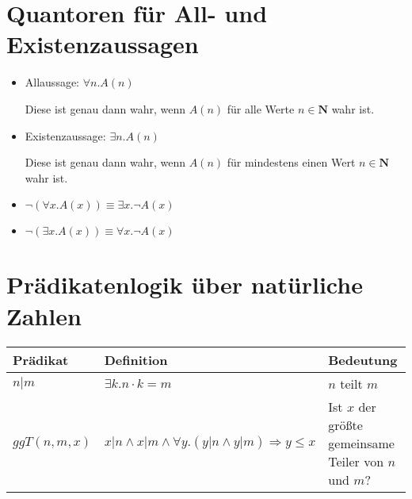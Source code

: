 \documentclass{article}
\begin{document}
\large
\section*{Quantoren für All- und Existenzaussagen}

\begin{itemize}[label=]
	\item {\Large Allaussage:}
	      $\forall n. A(n)$

	      Diese ist genau dann wahr, wenn $A(n)$ für
	      alle Werte $n \in \mathbf{N}$ wahr ist. \\

	\item {\Large Existenzaussage:}
	      $\exists n. A(n)$

	      Diese ist genau dann wahr, wenn $A(n)$ für
	      mindestens einen Wert $n \in \mathbf{N}$ wahr ist.
\end{itemize}
\begin{lemmaBox}{2.2}
	\begin{itemize}[label=]
		\item $\neg (\forall x. A(x)) \equiv \exists x. \neg A(x)$
		\item $\neg (\exists x. A(x)) \equiv \forall x. \neg A(x)$
	\end{itemize}
\end{lemmaBox}


\section*{Prädikatenlogik über natürliche Zahlen}
\begin{center}
	\begin{tabular}{C{3cm}|C{4cm}|L{6cm}}
		Prädikat     & Definition                                                            & Bedeutung                                             \\
		[10pt]\midrule
		$n|m$        & $\exists k. n \cdot k = m$                                            & $n$ teilt $m$                                         \\
		[10pt]
		$ggT(n,m,x)$ & $x|n \land x|m \land \forall y. (y|n \land y|m) \Rightarrow y \leq x$ & Ist $x$ der größte gemeinsame Teiler von $n$ und $m$? \\
	\end{tabular}
\end{center}
\end{document}
